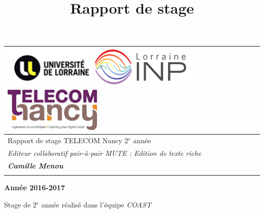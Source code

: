 \documentclass[12pt]{article}
\title{Rapport de stage}
\begin{document}
\begin{center}

\vspace{3pt} \noindent
\begin{tabular}{p{439pt}}
\parbox{439pt}{\centering \includegraphics[width=125pt]{gallery/img-3.png}\textbf{{\large 
\includegraphics[width=146pt]{gallery/img-2.png}
}}\includegraphics[width=132pt]{gallery/img-1.png}{\small  }} \\

\hline
\vspace{5cm}
\parbox{439pt}{\centering 
{\Huge Rapport de stage TELECOM Nancy 2$^{e}$ année}
} \\
\vspace{1pt}
\parbox{439pt}{\centering 
\textit{{\Huge Editeur collaboratif pair-à-pair MUTE : Edition de texte riche}}
} \\
\vspace{2cm}
\parbox{439pt}{\centering 
\textbf{\textit{{\Large Camille Menou}}}
} \\
\parbox{439pt}{\centering } \\
\end{tabular}

\end{center}



\begin{center}
\textbf{Ann\'{e}e 2016-2017}
\end{center}

\begin{center}
Stage de 2$^{e}$ année réalisé dans l'équipe \textit{COAST}
\end{center}
\end{document}
